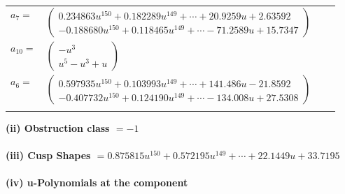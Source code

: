 \documentclass[1p]{elsarticle_modified}
\theoremstyle{definition}
\begin{document}
\begin{tabular}{m{7pt} m{180pt} m{7pt} m{180pt} }
\flushright $a_{7}=$&$\begin{pmatrix}0.234863 u^{150}+0.182289 u^{149}+\cdots+20.9259 u+2.63592\\-0.188680 u^{150}+0.118465 u^{149}+\cdots-71.2589 u+15.7347\end{pmatrix}$ \\
\flushright $a_{10}=$&$\begin{pmatrix}- u^3\\u^5- u^3+u\end{pmatrix}$ \\
\flushright $a_{6}=$&$\begin{pmatrix}0.597935 u^{150}+0.103993 u^{149}+\cdots+141.486 u-21.8592\\-0.407732 u^{150}+0.124190 u^{149}+\cdots-134.008 u+27.5308\end{pmatrix}$\\&\end{tabular}
\flushleft \textbf{(ii) Obstruction class $= -1$}\\~\\
\flushleft \textbf{(iii) Cusp Shapes $= 0.875815 u^{150}+0.572195 u^{149}+\cdots+22.1449 u+33.7195$}\\~\\
\newpage\renewcommand{\arraystretch}{1}
\flushleft \textbf{(iv) u-Polynomials at the component}\newline \\
\end{document}
